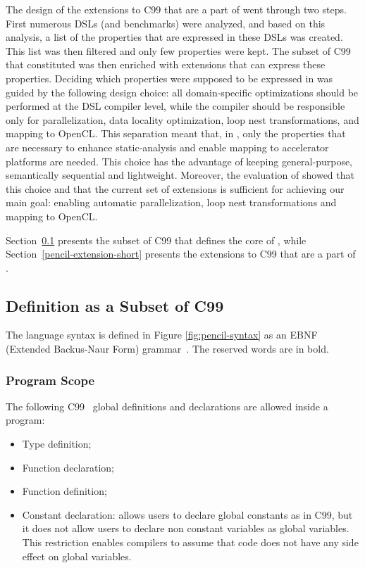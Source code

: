 The design of the extensions to C99 that are a part of \pencil went
through two steps.
First numerous DSLs (and benchmarks) were analyzed, and based on this
analysis,  a list of the properties that are expressed in these DSLs
was created.
This list was then filtered and only few properties were kept.
The subset of C99 that constituted \pencil was then enriched with
extensions that can express these properties.
Deciding which properties were supposed to be expressed in \pencil
was guided by the following design choice:
all domain-specific optimizations should be performed at the DSL compiler
level, while the \pencil compiler should be responsible only for parallelization,
data locality optimization, loop nest transformations, and mapping to OpenCL.
This separation meant that, in \pencil, only the properties that are necessary
to enhance static-analysis and enable mapping to accelerator platforms are needed.
This choice has the advantage of keeping \pencil general-purpose,
semantically sequential and lightweight.
Moreover, the evaluation of \pencil showed that this choice and that the
current set of extensions is sufficient for achieving our main goal:
enabling automatic parallelization, loop nest transformations
and mapping to OpenCL.

Section~\ref{pencil-c99-subset} presents the subset of C99 that
defines the core of \pencil, while Section~\ref{pencil-extension-short}
presents the extensions to C99 that are a part of \pencil.

\subsection{\pencil Definition as a Subset of C99}
\label{pencil-c99-subset}
The language syntax is defined in Figure \ref{fig:pencil-syntax} as an EBNF (Extended
Backus-Naur Form) grammar~\cite{wirth1996EBNF}.
The reserved words are in bold.



\subsubsection{Program Scope}
The following C99~\cite{c99} global definitions and declarations are allowed inside a
\pencil program:
\begin{itemize}
  \item Type definition;
  \item Function declaration;
  \item Function definition;
  \item Constant declaration: \pencil allows users to declare global constants
        as in C99, but it does not allow users to declare non constant variables
        as global variables.
        This restriction enables \pencil compilers to
        assume that \pencil code does not have any side effect on global
        variables.
\end{itemize}

